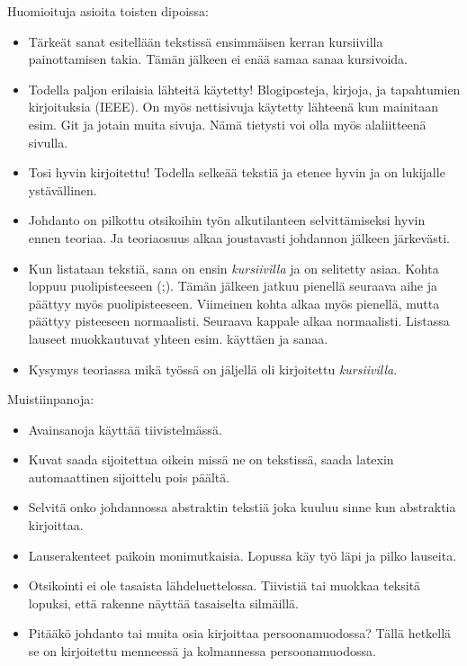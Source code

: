 Huomioituja asioita toisten dipoissa:
\begin{itemize}
	\item Tärkeät sanat esitellään tekstissä ensimmäisen kerran kursiivilla painottamisen takia. Tämän jälkeen ei enää samaa sanaa kursivoida.
	\item Todella paljon erilaisia lähteitä käytetty! Blogiposteja, kirjoja, ja tapahtumien kirjoituksia (IEEE). On myös nettisivuja käytetty lähteenä kun mainitaan esim. Git ja jotain muita sivuja. Nämä tietysti voi olla myös alaliitteenä sivulla.
	\item Tosi hyvin kirjoitettu! Todella selkeää tekstiä ja etenee hyvin ja on lukijalle ystävällinen.
	\item Johdanto on pilkottu otsikoihin työn alkutilanteen selvittämiseksi hyvin ennen teoriaa. Ja teoriaosuus alkaa joustavasti johdannon jälkeen järkevästi.
	\item Kun listataan tekstiä, sana on ensin \emph{kursiivilla} ja on selitetty asiaa. Kohta loppuu puolipisteeseen (;). Tämän jälkeen jatkuu pienellä seuraava aihe ja päättyy myös puolipisteeseen. Viimeinen kohta alkaa myös pienellä, mutta päättyy pisteeseen normaalisti. Seuraava kappale alkaa normaalisti. Listassa lauseet muokkautuvat yhteen esim. käyttäen ja sanaa.
	\item Kysymys teoriassa mikä työssä on jäljellä oli kirjoitettu \emph{kursiivilla}.
\end{itemize}

Muistiinpanoja:
\begin{itemize}
	\item Avainsanoja käyttää tiivistelmässä.
	\item Kuvat saada sijoitettua oikein missä ne on tekstissä, saada latexin automaattinen sijoittelu pois päältä.
	\item Selvitä onko johdannossa abstraktin tekstiä joka kuuluu sinne kun abstraktia kirjoittaa.
	\item Lauserakenteet paikoin monimutkaisia. Lopussa käy työ läpi ja pilko lauseita.
	\item Otsikointi ei ole tasaista lähdeluettelossa. Tiivistiä tai muokkaa teksitä lopuksi, että rakenne näyttää tasaiselta silmäillä.
	\item Pitääkö johdanto tai muita osia kirjoittaa persoonamuodossa? Tällä hetkellä se on kirjoitettu menneessä ja kolmannessa persoonamuodossa.
\end{itemize}